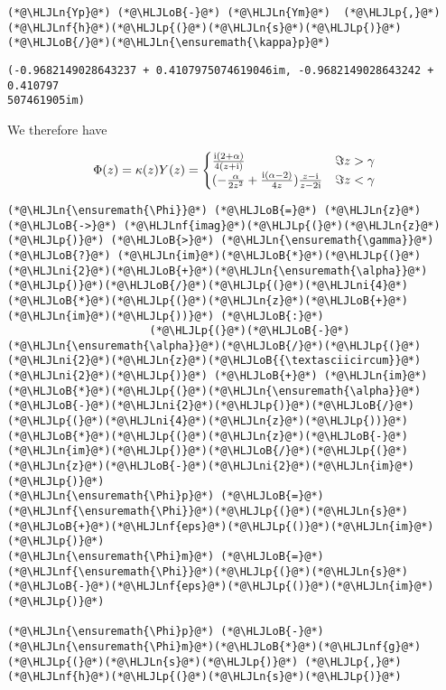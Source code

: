 \documentclass[12pt,landscape]{article}
\newcommand{\HLJLn}[1]{#1}
\newcommand{\HLJLnf}[1]{\textcolor[RGB]{66,102,213}{#1}}
\newcommand{\HLJLni}[1]{\textcolor[RGB]{59,151,46}{#1}}
\newcommand{\HLJLoB}[1]{\textcolor[RGB]{102,102,102}{\textbf{#1}}}
\newcommand{\HLJLp}[1]{#1}
\def\I{ {\rm i} }
\begin{document}
{\begin{lstlisting}
(*@\HLJLn{Yp}@*) (*@\HLJLoB{-}@*) (*@\HLJLn{Ym}@*)  (*@\HLJLp{,}@*) (*@\HLJLnf{h}@*)(*@\HLJLp{(}@*)(*@\HLJLn{s}@*)(*@\HLJLp{)}@*)(*@\HLJLoB{/}@*)(*@\HLJLn{\ensuremath{\kappa}p}@*)
\end{lstlisting}

\begin{lstlisting}
(-0.9682149028643237 + 0.4107975074619046im, -0.9682149028643242 + 0.410797
507461905im)
\end{lstlisting}


We therefore have

\[
\Phi(z)  = \kappa(z) Y(z) = \begin{cases}
 {\I (2+\alpha) \over 4 (z+ \I)}  & \Im z > \gamma \\
(-{\alpha \over 2 z^2}+{\I (\alpha-2) \over 4 z}  ) {z - \I  \over z - 2\I} & \Im z < \gamma
\end{cases}
\]

\begin{lstlisting}
(*@\HLJLn{\ensuremath{\Phi}}@*) (*@\HLJLoB{=}@*) (*@\HLJLn{z}@*) (*@\HLJLoB{->}@*) (*@\HLJLnf{imag}@*)(*@\HLJLp{(}@*)(*@\HLJLn{z}@*)(*@\HLJLp{)}@*) (*@\HLJLoB{>}@*) (*@\HLJLn{\ensuremath{\gamma}}@*) (*@\HLJLoB{?}@*) (*@\HLJLn{im}@*)(*@\HLJLoB{*}@*)(*@\HLJLp{(}@*)(*@\HLJLni{2}@*)(*@\HLJLoB{+}@*)(*@\HLJLn{\ensuremath{\alpha}}@*)(*@\HLJLp{)}@*)(*@\HLJLoB{/}@*)(*@\HLJLp{(}@*)(*@\HLJLni{4}@*)(*@\HLJLoB{*}@*)(*@\HLJLp{(}@*)(*@\HLJLn{z}@*)(*@\HLJLoB{+}@*)(*@\HLJLn{im}@*)(*@\HLJLp{))}@*) (*@\HLJLoB{:}@*)
                      (*@\HLJLp{(}@*)(*@\HLJLoB{-}@*)(*@\HLJLn{\ensuremath{\alpha}}@*)(*@\HLJLoB{/}@*)(*@\HLJLp{(}@*)(*@\HLJLni{2}@*)(*@\HLJLn{z}@*)(*@\HLJLoB{{\textasciicircum}}@*)(*@\HLJLni{2}@*)(*@\HLJLp{)}@*) (*@\HLJLoB{+}@*) (*@\HLJLn{im}@*)(*@\HLJLoB{*}@*)(*@\HLJLp{(}@*)(*@\HLJLn{\ensuremath{\alpha}}@*)(*@\HLJLoB{-}@*)(*@\HLJLni{2}@*)(*@\HLJLp{)}@*)(*@\HLJLoB{/}@*)(*@\HLJLp{(}@*)(*@\HLJLni{4}@*)(*@\HLJLn{z}@*)(*@\HLJLp{))}@*)(*@\HLJLoB{*}@*)(*@\HLJLp{(}@*)(*@\HLJLn{z}@*)(*@\HLJLoB{-}@*)(*@\HLJLn{im}@*)(*@\HLJLp{)}@*)(*@\HLJLoB{/}@*)(*@\HLJLp{(}@*)(*@\HLJLn{z}@*)(*@\HLJLoB{-}@*)(*@\HLJLni{2}@*)(*@\HLJLn{im}@*)(*@\HLJLp{)}@*)
(*@\HLJLn{\ensuremath{\Phi}p}@*) (*@\HLJLoB{=}@*) (*@\HLJLnf{\ensuremath{\Phi}}@*)(*@\HLJLp{(}@*)(*@\HLJLn{s}@*)(*@\HLJLoB{+}@*)(*@\HLJLnf{eps}@*)(*@\HLJLp{()}@*)(*@\HLJLn{im}@*)(*@\HLJLp{)}@*)
(*@\HLJLn{\ensuremath{\Phi}m}@*) (*@\HLJLoB{=}@*) (*@\HLJLnf{\ensuremath{\Phi}}@*)(*@\HLJLp{(}@*)(*@\HLJLn{s}@*)(*@\HLJLoB{-}@*)(*@\HLJLnf{eps}@*)(*@\HLJLp{()}@*)(*@\HLJLn{im}@*)(*@\HLJLp{)}@*)

(*@\HLJLn{\ensuremath{\Phi}p}@*) (*@\HLJLoB{-}@*) (*@\HLJLn{\ensuremath{\Phi}m}@*)(*@\HLJLoB{*}@*)(*@\HLJLnf{g}@*)(*@\HLJLp{(}@*)(*@\HLJLn{s}@*)(*@\HLJLp{)}@*) (*@\HLJLp{,}@*) (*@\HLJLnf{h}@*)(*@\HLJLp{(}@*)(*@\HLJLn{s}@*)(*@\HLJLp{)}@*)
\end{lstlisting}

}
\end{document}
